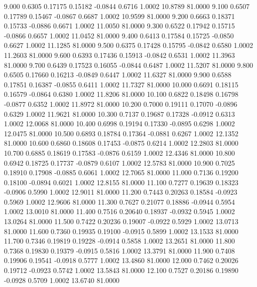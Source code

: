    9.000   0.6305   0.17175   0.15182  -0.0844   0.6716   1.0002  10.8789  81.0000
   9.100   0.6507   0.17789   0.15467  -0.0867   0.6687   1.0002  10.9599  81.0000
   9.200   0.6663   0.18371   0.15733  -0.0886   0.6671   1.0002  11.0050  81.0000
   9.300   0.6522   0.17942   0.15715  -0.0866   0.6657   1.0002  11.0452  81.0000
   9.400   0.6413   0.17584   0.15725  -0.0850   0.6627   1.0002  11.1285  81.0000
   9.500   0.6375   0.17428   0.15795  -0.0842   0.6580   1.0002  11.2603  81.0000
   9.600   0.6393   0.17436   0.15913  -0.0842   0.6531   1.0002  11.3963  81.0000
   9.700   0.6439   0.17523   0.16055  -0.0844   0.6487   1.0002  11.5207  81.0000
   9.800   0.6505   0.17660   0.16213  -0.0849   0.6447   1.0002  11.6327  81.0000
   9.900   0.6588   0.17851   0.16387  -0.0855   0.6411   1.0002  11.7327  81.0000
  10.000   0.6691   0.18115   0.16579  -0.0864   0.6380   1.0002  11.8206  81.0000
  10.100   0.6822   0.18498   0.16798  -0.0877   0.6352   1.0002  11.8972  81.0000
  10.200   0.7000   0.19111   0.17070  -0.0896   0.6329   1.0002  11.9621  81.0000
  10.300   0.7137   0.19687   0.17328  -0.0912   0.6313   1.0002  12.0068  81.0000
  10.400   0.6998   0.19194   0.17330  -0.0895   0.6298   1.0002  12.0475  81.0000
  10.500   0.6893   0.18784   0.17364  -0.0881   0.6267   1.0002  12.1352  81.0000
  10.600   0.6860   0.18608   0.17453  -0.0875   0.6214   1.0002  12.2803  81.0000
  10.700   0.6885   0.18619   0.17583  -0.0876   0.6159   1.0002  12.4346  81.0000
  10.800   0.6942   0.18725   0.17737  -0.0879   0.6107   1.0002  12.5783  81.0000
  10.900   0.7025   0.18910   0.17908  -0.0885   0.6061   1.0002  12.7065  81.0000
  11.000   0.7136   0.19200   0.18100  -0.0894   0.6021   1.0002  12.8155  81.0000
  11.100   0.7277   0.19639   0.18323  -0.0906   0.5990   1.0002  12.9011  81.0000
  11.200   0.7443   0.20263   0.18584  -0.0923   0.5969   1.0002  12.9606  81.0000
  11.300   0.7627   0.21077   0.18886  -0.0944   0.5954   1.0002  13.0010  81.0000
  11.400   0.7516   0.20640   0.18937  -0.0932   0.5945   1.0002  13.0264  81.0000
  11.500   0.7422   0.20236   0.19007  -0.0922   0.5929   1.0002  13.0713  81.0000
  11.600   0.7360   0.19935   0.19100  -0.0915   0.5899   1.0002  13.1533  81.0000
  11.700   0.7346   0.19819   0.19228  -0.0914   0.5858   1.0002  13.2651  81.0000
  11.800   0.7368   0.19830   0.19379  -0.0915   0.5816   1.0002  13.3791  81.0000
  11.900   0.7408   0.19906   0.19541  -0.0918   0.5777   1.0002  13.4860  81.0000
  12.000   0.7462   0.20026   0.19712  -0.0923   0.5742   1.0002  13.5843  81.0000
  12.100   0.7527   0.20186   0.19890  -0.0928   0.5709   1.0002  13.6740  81.0000
